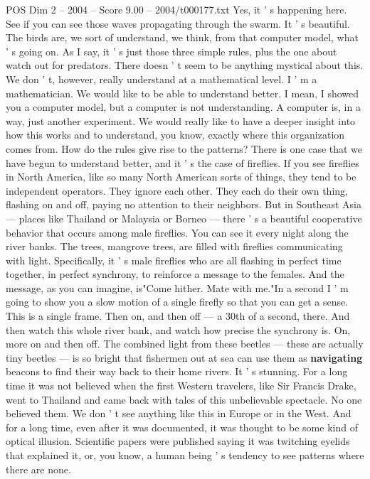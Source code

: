 \begin{textsample}{POS Dim 2 – 2004 – Score 9.00 – 2004/t000177.txt}
Yes, it ' s happening here.
See if you can see those waves propagating through the swarm.
It ' s beautiful.
The birds are, we sort of understand, we think, from that computer model, what ' s going on.
As I say, it ' s just those three simple rules, plus the one about watch out for predators.
There doesn ' t seem to be anything mystical about this.
We don ' t, however, really understand at a mathematical level.
I ' m a mathematician.
We would like to be able to understand better.
I mean, I showed you a computer model, but a computer is not understanding.
A computer is, in a way, just another experiment.
We would really like to have a deeper insight into how this works and to understand, you know, exactly where this organization comes from.
How do the rules give rise to the patterns?
There is one case that we have begun to understand better, and it ' s the case of fireflies.
If you see fireflies in North America, like so many North American sorts of things, they tend to be independent operators.
They ignore each other.
They each do their own thing, flashing on and off, paying no attention to their neighbors.
But in Southeast Asia — places like Thailand or Malaysia or Borneo — there ' s a beautiful cooperative behavior that occurs among male fireflies.
You can see it every night along the river banks.
The trees, mangrove trees, are filled with fireflies communicating with light.
Specifically, it ' s male fireflies who are all flashing in perfect time together, in perfect synchrony, to reinforce a message to the females.
And the message, as you can imagine, is"Come hither.
Mate with me."In a second I ' m going to show you a slow motion of a single firefly so that you can get a sense.
This is a single frame.
Then on, and then off — a 30th of a second, there.
And then watch this whole river bank, and watch how precise the synchrony is.
On, more on and then off.
The combined light from these beetles — these are actually tiny beetles — is so bright that fishermen out at sea can use them as \textbf{navigating} beacons to find their way back to their home rivers.
It ' s stunning.
For a long time it was not believed when the first Western travelers, like Sir Francis Drake, went to Thailand and came back with tales of this unbelievable spectacle.
No one believed them.
We don ' t see anything like this in Europe or in the West.
And for a long time, even after it was documented, it was thought to be some kind of optical illusion.
Scientific papers were published saying it was twitching eyelids that explained it, or, you know, a human being ' s tendency to see patterns where there are none.

\end{textsample}
